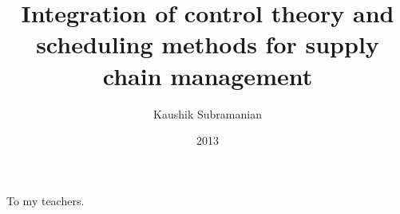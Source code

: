 

\clearpage{}  %



\title{Integration of control theory and scheduling methods for supply
  chain management}
\author{Kaushik Subramanian}
\date{2013}
\maketitle

\copyrightpage

\begin{dedication}
To my teachers.
\end{dedication}


